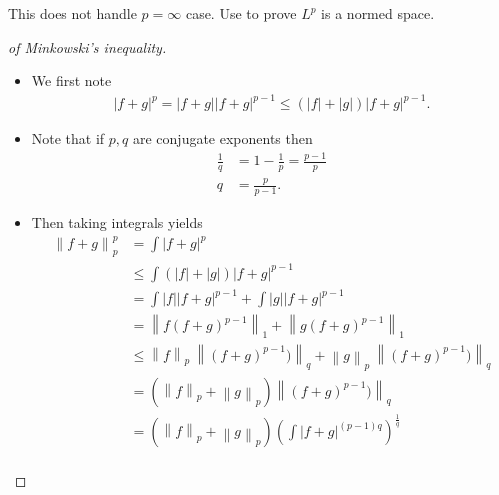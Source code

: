 \begin{remark}

This does not handle \(p=\infty\) case. Use to prove \(L^p\) is a normed
space.

\end{remark}

\begin{proof}[of Minkowski's inequality]

\envlist

\begin{itemize}
\item
  We first note
  \begin{align*}  
  {\left\lvert {f+g} \right\rvert}^p = {\left\lvert {f+g} \right\rvert}{\left\lvert {f+g} \right\rvert}^{p-1} \leq \left( {\left\lvert {f} \right\rvert} + {\left\lvert {g} \right\rvert}\right) {\left\lvert {f+g} \right\rvert}^{p-1}
  .\end{align*}
\item
  Note that if \(p,q\) are conjugate exponents then
  \begin{align*}  
  \frac 1 q &= 1 - \frac 1 p = \frac{p-1} p \\
  q &= \frac p {p-1} 
  .\end{align*}
\item
  Then taking integrals yields
  \begin{align*}  
  {\left\lVert {f+g} \right\rVert}_p^p &=
  \int {\left\lvert {f+g} \right\rvert}^p \\
  &\leq \int \left( {\left\lvert {f} \right\rvert} + {\left\lvert {g} \right\rvert}\right) {\left\lvert {f+g} \right\rvert}^{p-1} \\ 
  &= \int {\left\lvert {f} \right\rvert} {\left\lvert {f+g} \right\rvert}^{p-1} + \int {\left\lvert {g} \right\rvert} {\left\lvert {f+g} \right\rvert}^{p-1} \\
  &= {\left\lVert {f(f+g)^{p-1}} \right\rVert}_1 + {\left\lVert {g(f+g)^{p-1}} \right\rVert}_1 \\
  &\leq {\left\lVert {f} \right\rVert}_p ~{\left\lVert {(f+g)^{p-1})} \right\rVert}_q + {\left\lVert {g} \right\rVert}_p ~{\left\lVert {(f+g)^{p-1})} \right\rVert}_q \\
  &= \left( {\left\lVert {f} \right\rVert}_p + {\left\lVert {g} \right\rVert}_p \right) {\left\lVert { (f+g)^{p-1})} \right\rVert}_q \\
  &= \left( {\left\lVert {f} \right\rVert}_p + {\left\lVert {g} \right\rVert}_p \right) \left( \int {\left\lvert {f+g} \right\rvert}^{(p-1)q} \right)^{\frac 1 q} \\

\end{align*}
\end{itemize}
\end{proof}
